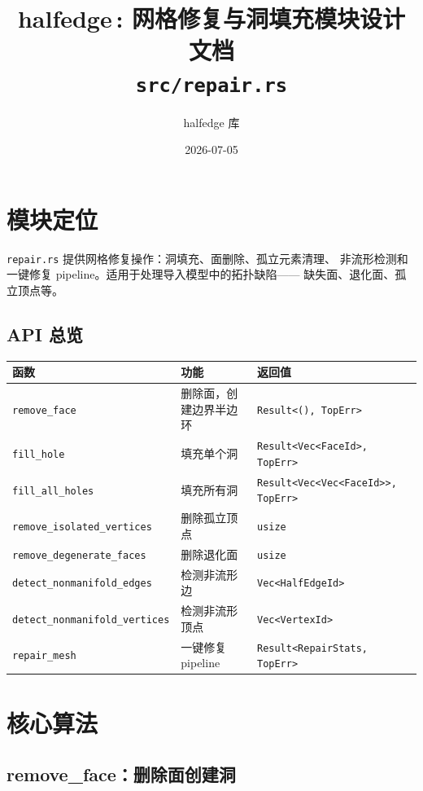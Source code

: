 \documentclass[11pt,a4paper]{article}
\title{\textbf{halfedge\,: 网格修复与洞填充模块设计文档} \\ \large \texttt{src/repair.rs}}
\author{halfedge 库}
\date{2026-07-05}
\begin{document}
\maketitle
\tableofcontents

\section{模块定位}

\texttt{repair.rs} 提供网格修复操作：洞填充、面删除、孤立元素清理、
非流形检测和一键修复 pipeline。适用于处理导入模型中的拓扑缺陷——
缺失面、退化面、孤立顶点等。

\subsection{API 总览}

\begin{center}
\renewcommand{\arraystretch}{1.18}
\begin{tabular}{@{}lp{3.8cm}l@{}}
  \toprule
  \textbf{函数} & \textbf{功能} & \textbf{返回值} \\
  \midrule
  \texttt{remove\_face} & 删除面，创建边界半边环 & \texttt{Result<(), TopErr>} \\
  \texttt{fill\_hole} & 填充单个洞 & \texttt{Result<Vec<FaceId>, TopErr>} \\
  \texttt{fill\_all\_holes} & 填充所有洞 & \texttt{Result<Vec<Vec<FaceId>>, TopErr>} \\
  \texttt{remove\_isolated\_vertices} & 删除孤立顶点 & \texttt{usize} \\
  \texttt{remove\_degenerate\_faces} & 删除退化面 & \texttt{usize} \\
  \texttt{detect\_nonmanifold\_edges} & 检测非流形边 & \texttt{Vec<HalfEdgeId>} \\
  \texttt{detect\_nonmanifold\_vertices} & 检测非流形顶点 & \texttt{Vec<VertexId>} \\
  \texttt{repair\_mesh} & 一键修复 pipeline & \texttt{Result<RepairStats, TopErr>} \\
  \bottomrule
\end{tabular}
\end{center}

\section{核心算法}

\subsection{remove\_face：删除面创建洞}
\end{document}
